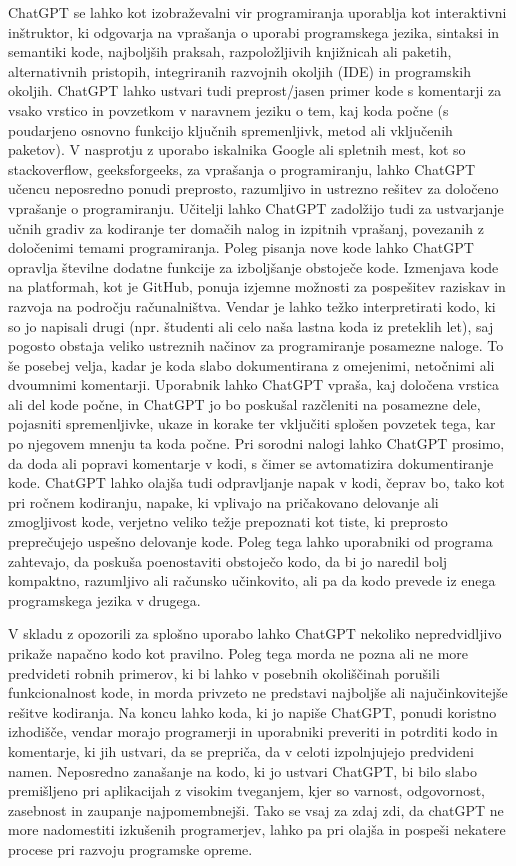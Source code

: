 \documentclass[a4paper,12pt,openright]{book}
\begin{document}
ChatGPT se lahko kot izobraževalni vir programiranja uporablja kot interaktivni inštruktor, ki odgovarja na vprašanja o uporabi programskega jezika, sintaksi in semantiki kode, najboljših praksah, razpoložljivih knjižnicah ali paketih, alternativnih pristopih, integriranih razvojnih okoljih (IDE) in programskih okoljih. ChatGPT lahko ustvari tudi preprost/jasen primer kode s komentarji za vsako vrstico in povzetkom v naravnem jeziku o tem, kaj koda počne (s poudarjeno osnovno funkcijo ključnih spremenljivk, metod ali vključenih paketov). V nasprotju z uporabo iskalnika Google ali spletnih mest, kot so stackoverflow, geeksforgeeks, za vprašanja o programiranju, lahko ChatGPT učencu neposredno ponudi preprosto, razumljivo in ustrezno rešitev za določeno vprašanje o programiranju. Učitelji lahko ChatGPT zadolžijo tudi za ustvarjanje učnih gradiv za kodiranje ter domačih nalog in izpitnih vprašanj, povezanih z določenimi temami programiranja.
Poleg pisanja nove kode lahko ChatGPT opravlja številne dodatne funkcije za izboljšanje obstoječe kode. Izmenjava kode na platformah, kot je GitHub, ponuja izjemne možnosti za pospešitev raziskav in razvoja na področju računalništva. Vendar je lahko težko interpretirati kodo, ki so jo napisali drugi (npr. študenti ali celo naša lastna koda iz preteklih let), saj pogosto obstaja veliko ustreznih načinov za programiranje posamezne naloge. To še posebej velja, kadar je koda slabo dokumentirana z omejenimi, netočnimi ali dvoumnimi komentarji. Uporabnik lahko ChatGPT vpraša, kaj določena vrstica ali del kode počne, in ChatGPT jo bo poskušal razčleniti na posamezne dele, pojasniti spremenljivke, ukaze in korake ter vključiti splošen povzetek tega, kar po njegovem mnenju ta koda počne. Pri sorodni nalogi lahko ChatGPT prosimo, da doda ali popravi komentarje v kodi, s čimer se avtomatizira dokumentiranje kode. ChatGPT lahko olajša tudi odpravljanje napak v kodi, čeprav bo, tako kot pri ročnem kodiranju, napake, ki vplivajo na pričakovano delovanje ali zmogljivost kode, verjetno veliko težje prepoznati kot tiste, ki preprosto preprečujejo uspešno delovanje kode. Poleg tega lahko uporabniki od programa zahtevajo, da poskuša poenostaviti obstoječo kodo, da bi jo naredil bolj kompaktno, razumljivo ali računsko učinkovito, ali pa da kodo prevede iz enega programskega jezika v drugega.

V skladu z opozorili za splošno uporabo lahko ChatGPT nekoliko nepredvidljivo prikaže napačno kodo kot pravilno. Poleg tega morda ne pozna ali ne more predvideti robnih primerov, ki bi lahko v posebnih okoliščinah porušili funkcionalnost kode, in morda privzeto ne predstavi najboljše ali najučinkovitejše rešitve kodiranja. Na koncu lahko koda, ki jo napiše ChatGPT, ponudi koristno izhodišče, vendar morajo programerji in uporabniki preveriti in potrditi kodo in komentarje, ki jih ustvari, da se prepriča, da v celoti izpolnjujejo predvideni namen. Neposredno zanašanje na kodo, ki jo ustvari ChatGPT, bi bilo slabo premišljeno pri aplikacijah z visokim tveganjem, kjer so varnost, odgovornost, zasebnost in zaupanje najpomembnejši. Tako se vsaj za zdaj zdi, da chatGPT ne more nadomestiti izkušenih programerjev, lahko pa pri olajša in pospeši nekatere procese pri razvoju programske opreme.
\cite{Meyer2023}
\end{document}
